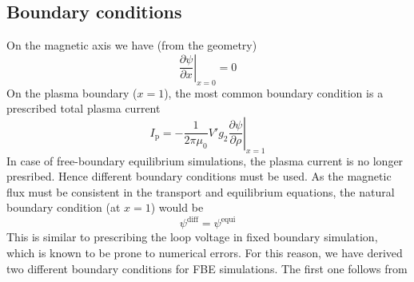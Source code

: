 \subsection{Boundary conditions}
On the magnetic axis we have (from the geometry)
\begin{equation}
{\left. {\frac{{\partial \psi }}{{\partial x }}} \right|_{x = 0}} = 0
\end{equation}
On the plasma boundary ($x=1$), the most common boundary condition is 
a prescribed total plasma current
\begin{equation}
{I_{\text{p}}} = {\left. { - \frac{1}{{2\pi {\mu _0}}}V'{g_2}\frac{{\partial \psi }}{{\partial \rho }}} \right|_{x = 1}}
\end{equation}
In case of free-boundary equilibrium simulations, the plasma current is no longer presribed.
Hence different boundary conditions must be used. As the magnetic flux must be consistent
in the transport and equilibrium equations, the natural boundary condition (at $x=1$) would be
\begin{equation}
\label{eq:bcflux}
{\psi ^{{\text{diff}}}} = {\psi ^{{\text{equi}}}}
\end{equation}
This is similar to prescribing the loop voltage in fixed boundary simulation,
which is known to be prone to numerical errors. For this reason, we have derived two
different boundary conditions for FBE simulations. The first one follows from
